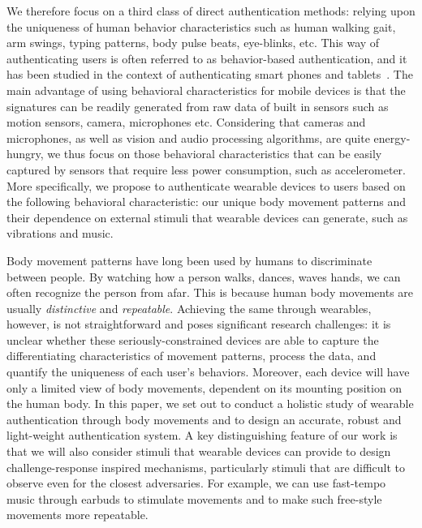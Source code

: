 We therefore focus on a third class of direct authentication methods: relying upon the uniqueness of human behavior characteristics such as human walking gait, arm swings, typing patterns, body pulse beats, eye-blinks, etc. This way of authenticating users is often referred to as behavior-based authentication, and it has been studied in the context of authenticating smart phones and tablets~\cite{rahman2014bodybeat,cornelius2014wearable,stevenage1999visual,okumura2006study,monrose2000keystroke,jorgensen2011mouse,bo2013silentsense,de2012touch}. The main advantage of using behavioral characteristics for mobile devices is that the signatures can be readily generated from raw data of built in sensors such as motion sensors, camera, microphones etc. Considering that cameras and microphones, as well as vision and audio processing algorithms, are quite energy-hungry, we thus focus on those behavioral characteristics that can be easily captured by sensors that require less power consumption, such as accelerometer. More specifically, we propose to authenticate wearable devices to users based on the following behavioral characteristic: our unique body movement patterns and their dependence on external stimuli that wearable devices can generate, such as vibrations and music.

\vspace{1mm} Body movement
patterns have long been used by humans to discriminate between people. By
watching how a person walks, dances, waves hands, we can often recognize
the person from afar. This is because human body movements are usually
\emph{distinctive} and \emph{repeatable}. Achieving the same through
wearables, however, is not straightforward and poses significant research
challenges: it is unclear whether these seriously-constrained devices are able
to capture the differentiating characteristics of movement patterns, process the data, and quantify the
uniqueness of each user's behaviors. Moreover, each device will have only a
limited view of body movements, dependent on its mounting position on the
human body. In this paper, we set out to conduct a holistic study of wearable
authentication through body movements and to design an accurate, robust and
light-weight authentication system. A key distinguishing feature of our work
is that we will also consider stimuli that wearable devices can provide to
design challenge-response inspired mechanisms, particularly stimuli that are
difficult to observe even for the closest adversaries. For example, we can use
fast-tempo music through earbuds to stimulate movements and to make such
free-style movements more repeatable.

